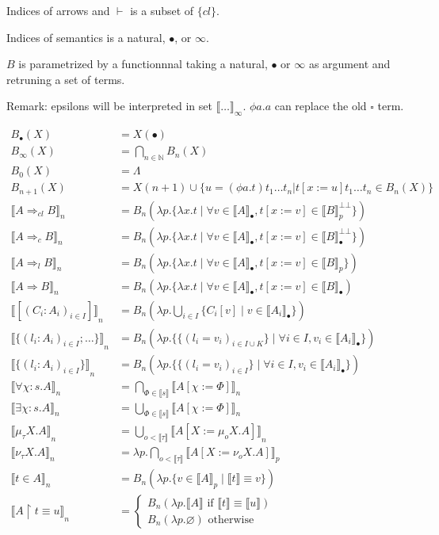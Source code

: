 \documentclass[oneside,a4]{book}
\renewcommand{\emptyset}{\varnothing}
\newcommand{\N}{\mathbb{N}}
\newcommand{\sem}[1]{\ensuremath{\llbracket #1 \rrbracket}}
\begin{document}
Indices of arrows and $\vdash$ is a subset of $\{cl\}$.

Indices of semantics is a natural, $\bullet$, or $\infty$.

$B$ is parametrized by a functionnnal taking  a natural, $\bullet$
or $\infty$ as argument and retruning a set of terms.

Remark: epsilons will be interpreted in set $\sem{\dots}_\infty$. $\phi a.a$
can replace the old $\square$ term.

  \begin{align*}
    B_\bullet(X) &= X(\bullet)\\
    B_\infty(X)  &= \bigcap_{n \in \N} B_n(X) \\
    B_0(X) &= \Lambda     \\
    B_{n+1}(X) &= X(n+1) \cup \{ u = (\phi a.t) t_1 \dots t_n |
    t[x:=u] t_1 \dots t_n \in B_n(X)\} \\
    \sem{A \Rightarrow_{cl} B}_n &=
      B_n(\lambda p. \{\lambda x.t \;|\; \forall v \in \sem{A}_\bullet,
      t[x := v] \in \sem{B}_p^{\bot\bot}\})\\
    \sem{A \Rightarrow_{c} B}_n &=
      B_n(\lambda p. \{\lambda x.t \;|\; \forall v \in \sem{A}_\bullet,
      t[x := v] \in \sem{B}_\bullet^{\bot\bot}\})\\
    \sem{A \Rightarrow_{l} B}_n &=
      B_n(\lambda p. \{\lambda x.t \;|\; \forall v \in \sem{A}_\bullet,
      t[x := v] \in \sem{B}_p\})\\
    \sem{A \Rightarrow B}_n &=
      B_n(\lambda p. \{\lambda x.t \;|\; \forall v \in \sem{A}_\bullet,
       t[x := v] \in \sem{B}_\bullet)\\
    \sem{[(C_i : A_i)_{i \in I}]}_n
      &=   B_n(\lambda p. \bigcup_{i \in I} \{C_i[v] \;|\; v \in
    \sem{A_i}_\bullet \})\\
    \sem{\{(l_i : A_i)_{i \in I}; \dots\}}_n
      &= B_n(\lambda p. \{\{(l_i = v_i)_{i \in I \cup K}\} \;|\; \forall i \in I, v_i \in \sem{A_i}_\bullet\})\\
    \sem{\{(l_i : A_i)_{i \in I}\}}_n
      &= B_n(\lambda p. \{\{(l_i = v_i)_{i \in I}\} \;|\; \forall i \in I,
    v_i \in \sem{A_i}_\bullet \})\\
    \sem{\forall \chi:s.A}_n
      &= \bigcap_{\Phi \in \sem{s}}
           \sem{A[\chi := \Phi]}_n\\
    \sem{\exists \chi:s.A}_n
      &= \bigcup_{\Phi \in \sem{s}}
           \sem{A[\chi := \Phi]}_n\\
    \sem{\mu_\tau X.A}_n
      &=  \bigcup_{o < \sem{\tau}}
            \sem{A[X := \mu_o X.A]}_n\\
    \sem{\nu_\tau X.A}_n
      &= \lambda p. \bigcap_{o < \sem{\tau}}
            \sem{A[X := \nu_o X.A]}_p\\
    \sem{t \in A}_n
      &= B_n(\lambda p. \{v \in \sem{A}_p \;|\; \sem{t}
      \equiv v\})\\
    \sem{A \restriction t \equiv u}_n
       &= \begin{cases}
           B_n(\lambda p. \sem{A} \text{ if } \sem{t}
             \equiv \sem{u})\\
           B_n(\lambda p.\emptyset) \text{ otherwise}
    \end{cases}
  \end{align*}
\end{document}
